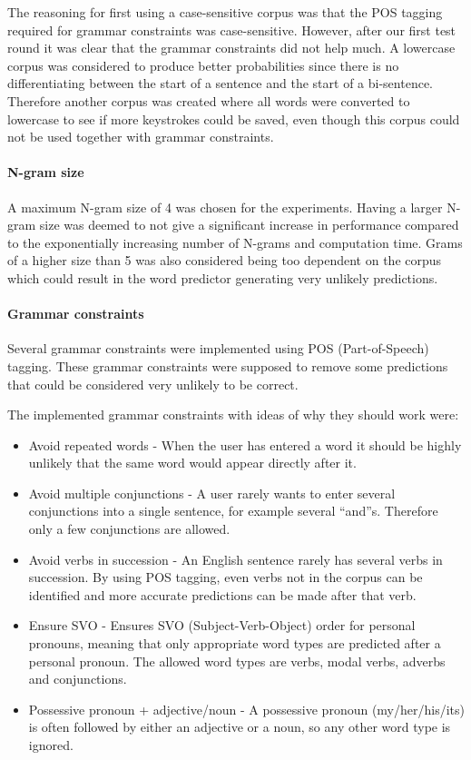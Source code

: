 The reasoning for first using a case-sensitive corpus was that the POS tagging required for grammar constraints was case-sensitive. However, after our first test round it was clear that the grammar constraints did not help much. A lowercase corpus was considered to produce better probabilities since there is no differentiating between the start of a sentence and the start of a bi-sentence. Therefore another corpus was created where all words were converted to lowercase to see if more keystrokes could be saved, even though this corpus could not be used together with grammar constraints.

\paragraph{N-gram size}
A maximum N-gram size of 4 was chosen for the experiments. Having a larger N-gram size was deemed to not give a significant increase in performance compared to the exponentially increasing number of N-grams and computation time. Grams of a higher size than 5 was also considered being too dependent on the corpus which could result in the word predictor generating very unlikely predictions.

\paragraph{Grammar constraints}
Several grammar constraints were implemented using POS (Part-of-Speech) tagging. These grammar constraints were supposed to remove some predictions that could be considered very unlikely to be correct.

The implemented grammar constraints with ideas of why they should work were:

\begin{itemize}
	\item Avoid repeated words - When the user has entered a word it should be highly unlikely that the same word would appear directly after it.
	\item Avoid multiple conjunctions -  A user rarely wants to enter several conjunctions into a single sentence, for example several “and”s. Therefore only a few conjunctions are allowed.
	\item Avoid verbs in succession - An English sentence rarely has several verbs in succession. By using POS tagging, even verbs not in the corpus can be identified and more accurate predictions can be made after that verb.
	\item Ensure SVO - Ensures SVO (Subject-Verb-Object) order for personal pronouns, meaning that only appropriate word types are predicted after a personal pronoun. The allowed word types are verbs, modal verbs, adverbs and conjunctions.
	\item Possessive pronoun + adjective/noun - A possessive pronoun (my/her/his/its) is often followed by either an adjective or a noun, so any other word type is ignored.
\end{itemize}

